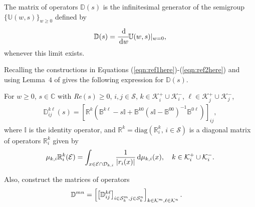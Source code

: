 The matrix of operators \(\mathbb D(s)\) is the infinitesimal generator of the semigroup \(\{\mathbb U(w,s)\}_{w\geq 0}\) defined by 
\[\mathbb D(s) = \cfrac{\, \mathrm{d}}{\, \mathrm{d} w}\mathbb U(w,s)|_{w=0},\]
whenever this limit exists.
			
	Recalling the constructions in Equations (\ref{eqn:ref1here})-(\ref{eqn:ref2here}) and using Lemma~$4$ of \cite{bo2014} gives the following expression for $\mathbb{D}(s)$. 
\begin{lem}\label{lemma: D(s)}
	For $w \geq 0$, $s \in \mathbb{C}$ with \textit{Re}$(s) \geq 0$, $i,j \in \mathcal{S}$, $k\in \mathcal K_i^+\cup\mathcal K_i^-$, $\ell\in \mathcal K_j^+\cup\mathcal K_j^-$,
	\begin{align*}
		\mathbb{D}_{ij}^{k\ell}(s) = [\mathbb{R}^{k}(
		\mathbb{B}^{k\ell } - s\mathbb{I} + \mathbb{B}^{k0 }(s \mathbb{I} - \mathbb{B}^{00})^{-1}\mathbb{B}^{0\ell})]_{ij}, 
	\end{align*} 
	where $\mathbb I$ is the identity operator, and $\mathbb{R}^{k} = \mathrm{diag}(\mathbb{R}_i^{k},\,i \in \mathcal{S})$ is a diagonal matrix of operators $\mathbb{R}_i^{k}$ given by 
	\begin{align*} 
		{\mu}_{k,i}\mathbb{R}_{i}^k(\mathcal{E}) = \int_{x \in \mathcal{E} \cap \mathcal{D}_{k,i}} \frac{1}{|r_i(x)|}\, \mathrm{d}  \mu_{k,i}(x),\quad k\in \mathcal K_i^+\cup\mathcal K_i^-.
	\end{align*} 
\end{lem}

	Also, construct the matrices of operators 
	\begin{align*}
		\mathbb D^{m n} &= \left[\left[\mathbb D_{ij}^{k \ell}\right]_{i\in\mathcal{S}_k^m,j\in\mathcal{S}_k^n}\right]_{k\in\mathcal K^m,\ell\in\mathcal K^n}.
        \end{align*}

